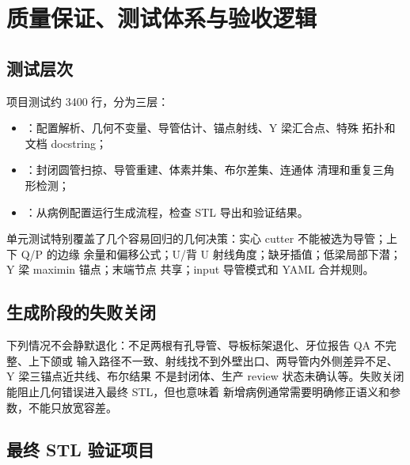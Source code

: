 \chapter{质量保证、测试体系与验收逻辑}

\section{测试层次}

项目测试约 3400 行，分为三层：

\begin{itemize}
  \item {}：配置解析、几何不变量、导管估计、锚点射线、Y 梁汇合点、特殊
  拓扑和文档 docstring；
  \item {}：封闭圆管扫掠、导管重建、体素并集、布尔差集、连通体
  清理和重复三角形检测；
  \item {}：从病例配置运行生成流程，检查 STL 导出和验证结果。
\end{itemize}

单元测试特别覆盖了几个容易回归的几何决策：实心 cutter 不能被选为导管；上下 Q/P 的边缘
余量和偏移公式；U/背 U 射线角度；缺牙插值；低梁局部下潜；Y 梁 maximin 锚点；末端节点
共享；input 导管模式和 YAML 合并规则。

\section{生成阶段的失败关闭}

下列情况不会静默退化：不足两根有孔导管、导板标架退化、牙位报告 QA 不完整、上下颌或
输入路径不一致、射线找不到外壁出口、两导管内外侧差异不足、Y 梁三锚点近共线、布尔结果
不是封闭体、生产 review 状态未确认等。失败关闭能阻止几何错误进入最终 STL，但也意味着
新增病例通常需要明确修正语义和参数，不能只放宽容差。

\section{最终 STL 验证项目}

